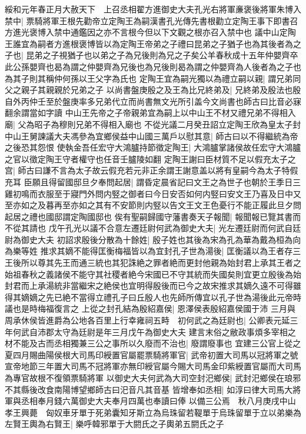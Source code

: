 綏和元年春正月大赦天下　上召丞相翟方進御史大夫孔光右將軍亷褒後將軍朱博入禁中|{
	票騎將軍王根先勸帝立定陶王為嗣漢書孔光傳先書根勸立定陶王事下即書召方進光褒博入禁中通鑑因之亦不言根今但以下文觀之根亦召入禁中也}
議中山定陶王誰宜為嗣者方進根褒博皆以為定陶王帝弟之子禮曰昆弟之子猶子也為其後者為之子也|{
	昆弟之子視猶子也以弟之子為兄後則為兄之子矣公羊春秋成十五年仲嬰齊卒此公孫嬰齊也曷為謂之仲嬰齊為兄後也為兄後則曷為謂之仲嬰齊為人後者為之子也為其子則其稱仲何孫以王父字為氏也}
定陶王宜為嗣光獨以為禮立嗣以親|{
	謂兄弟同父之親子其親親於兄弟之子}
以尚書盤庚殷之及王為比兄終弟及|{
	兄終弟及殷法也殷自外丙仲壬至於盤庚率多兄弟代立而尚書無文光所引盖今文尚書也師古曰比音必寐翻余謂當如字讀}
中山王先帝之子帝親弟宜為嗣上以中山王不材又禮兄弟不得相入廟|{
	父為昭子為穆則兄弟不得相入廟也}
不從光議二月癸丑詔立定陶王欣為皇太子封中山王舅諫議大夫馮參為宜鄉侯益中山國三萬戶以慰其意|{
	師古曰以不得繼統為帝之後恐其怨恨}
使執金吾任宏守大鴻臚持節徵定陶王|{
	大鴻臚掌諸侯故任宏守大鴻臚之官以徵定陶王守者權守也任音壬臚陵如翻}
定陶王謝曰臣材質不足以假充太子之宫|{
	師古曰謙不言為太子故云假充若元非正余謂王謝意盖以將有皇嗣今為太子特假充耳}
臣願且得留國邸旦夕奉問起居|{
	謂昏定晨省記曰文王之為世子也朝於王季日三雞初鳴而衣服至于寢門外問内竪之御者曰今日安否如何内竪曰安文王乃喜及日中又至亦如之及暮再至亦如之其有不安節則内竪以告文王文王色憂行不能正履此旦夕問起居之禮也國邸謂定陶國邸也}
俟有聖嗣歸國守藩書奏天子報聞|{
	報聞報已覽其書而不從其請也}
戊午孔光以議不合意左遷廷尉何武為御史大夫|{
	光左遷廷尉而何武自廷尉為御史大夫}
初詔求殷後分散為十餘姓|{
	殷子姓也其後為宋為孔為華為戴為桓為向為樂等姓}
推求其嫡不能得匡衡梅福皆以為宜封孔子世為湯後|{
	匡衡議以為王者存三王後所以尊其先王而通三統也其犯誅絶之罪者絶而更封他親為始封君上承其王者之始祖春秋之義諸侯不能守其社稷者絶今宋國已不守其統而失國矣則宜更立殷後為始封君而上承湯統非當繼宋之絶侯也宜明得殷後而已今之故宋推求其嫡久遠不可得雖得其嫡嫡之先已絶不當得立禮孔子曰丘殷人也先師所傳宜以孔子世為湯後此元帝時議也是時梅福復言之}
上從之封孔結為殷紹嘉侯|{
	恩澤侯表殷紹嘉侯國于沛}
三月與周承休侯皆進爵為公地各百里上行幸雍祠五畤　初何武之為廷尉也|{
	公卿表元延三年何武自沛郡太守為廷尉是年三月戊午為御史大夫}
建言末俗之敝政事煩多宰相之材不能及古而丞相獨兼三公之事所以久廢而不治也|{
	廢謂廢事也}
宜建三公官上從之夏四月賜曲陽侯根大司馬印綬置官屬罷票騎將軍官|{
	武帝初置大司馬以冠將軍之號宣帝地節三年置大司馬不冠將軍亦無印綬官屬今賜大司馬金印紫綬置官屬而大司馬為專官故根不復領票騎將軍}
以御史大夫何武為大司空封汜鄉侯|{
	武封汜鄉侯在琅邪不其縣後改食南陽博望鄉師古曰汜音凡其音基}
皆增奉如丞相|{
	如淳曰律大司馬大將軍與丞相奉月錢六萬御史大夫奉月四萬也奉讀曰俸}
以備三公焉　秋八月庚戌中山孝王興薨　匈奴車牙單于死弟囊知牙斯立為烏珠留若鞮單于烏珠留單于立以弟樂為左賢王輿為右賢王|{
	樂呼韓邪單于大閼氏之子輿弟五閼氏之子}
